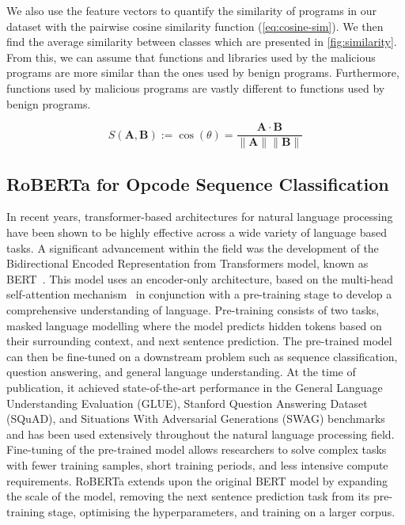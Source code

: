 \documentclass[conference,compsoc]{IEEEtran}
\begin{document}
We also use the feature vectors to quantify the similarity of programs in our dataset with the pairwise cosine similarity function (\ref{eq:cosine-sim}). We then find the average similarity between classes which are presented in \ref{fig:similarity}. From this, we can assume that functions and libraries used by the malicious programs are more similar than the ones used by benign programs. Furthermore, functions used by malicious programs are vastly different to functions used by benign programs. 

\begin{equation}
    S\left(\mathbf{A},\mathbf{B}\right) := \cos\left(\theta\right)=\frac{\mathbf {A} \cdot \mathbf {B}}{\|\mathbf {A} \|\|\mathbf {B} \|}\label{eq:cosine-sim}
\end{equation}

\subsection{RoBERTa for Opcode Sequence Classification}


\noindent
In recent years, transformer-based architectures for natural language processing have been shown to be highly effective across a wide variety of language based tasks. A significant advancement within the field was the development of the Bidirectional Encoded Representation from Transformers model, known as BERT~\cite{devlinBERTPretrainingDeep2019a}. This model uses an encoder-only architecture, based on the multi-head self-attention mechanism~\cite{vaswaniAttentionAllYou2023a} in conjunction with a pre-training stage to develop a comprehensive understanding of language. Pre-training consists of two tasks, masked language modelling where the model predicts hidden tokens based on their surrounding context, and next sentence prediction. The pre-trained model can then be fine-tuned on a downstream problem such as sequence classification, question answering, and general language understanding. At the time of publication, it achieved state-of-the-art performance in the General Language Understanding Evaluation (GLUE), Stanford Question Answering Dataset (SQuAD), and Situations With Adversarial Generations (SWAG) benchmarks and has been used extensively throughout the natural language processing field. Fine-tuning of the pre-trained model allows researchers to solve complex tasks with fewer training samples, short training periods, and less intensive compute requirements. RoBERTa extends upon the original BERT model by expanding the scale of the model, removing the next sentence prediction task from its pre-training stage, optimising the hyperparameters, and training on a larger corpus. 
\end{document}

